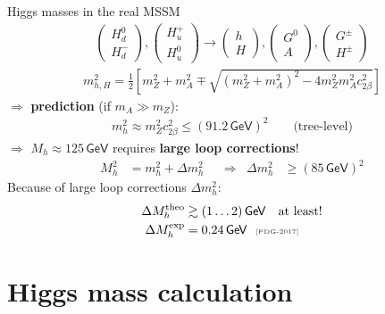 \documentclass[hyperref={pdfpagelabels=false},ngerman]{beamer}
\newcommand{\eh}[1]{\,\mathsf{#1}}
\newcommand{\mycite}[1]{\ensuremath{\text{\textcolor{darkgray}{\tiny [#1]}}}}
\renewcommand{\emph}{\textbf}
\begin{document}
\begin{frame}{Higgs masses in the real MSSM}
  \begin{align*}
    \begin{pmatrix}
      H_d^0 \\ H_d^-
    \end{pmatrix} ,
    \begin{pmatrix}
      H_u^+ \\ H_u^0
    \end{pmatrix}
    \rightarrow
    \begin{pmatrix}
      h \\ H
    \end{pmatrix} ,
    \begin{pmatrix}
      G^0 \\ A
    \end{pmatrix} ,
    \begin{pmatrix}
      G^\pm \\ H^\pm
    \end{pmatrix}
  \end{align*}
  \begin{align*}
    m_{h,H}^2 = \frac{1}{2} \left[
      m_Z^2 + m_A^2 \mp \sqrt{(m_Z^2 + m_A^2)^2 - 4 m_Z^2 m_A^2 c_{2\beta}^2}
    \right]
  \end{align*}
  $\Rightarrow$ \emph{prediction} (if $m_A \gg m_Z$):
  \begin{align*}
    m_h^2 \approx m_Z^2 c_{2\beta}^2
    \leq (91.2 \eh{GeV})^2  \qquad \text{(tree-level)}
  \end{align*}
  $\Rightarrow$ $M_h \approx 125\eh{GeV}$ requires \emph{large loop
    corrections}!
  \begin{align*}
    M_h^2 &= m_h^2 + \Delta m_h^2
    & &\Rightarrow &
    \Delta m_h^2 &\geq (85\eh{GeV})^2
  \end{align*}
  Because of large loop corrections $\Delta m_h^2$:
  \begin{align*}
    \Delta M_h^{\text{theo}} &\gtrsim (1\ldots 2)\eh{GeV} \quad \text{at least!} \\
    \Delta M_h^{\text{exp}} &= 0.24\eh{GeV} \ \ \mycite{PDG-2017}
  \end{align*}
\end{frame}


\section{Higgs mass calculation}
\end{document}
